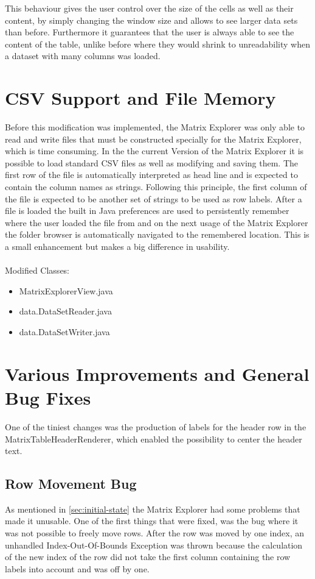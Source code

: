 This behaviour gives the user control over the size of the cells as well as their content, by simply changing the window size and allows to see larger data sets than before. Furthermore it guarantees that the user is always able to see the content of the table, unlike before where they would shrink to unreadability when a dataset with many columns was loaded.

\section{CSV Support and File Memory}

Before this modification was implemented, the Matrix Explorer was only able to read and write files that must be constructed specially for the Matrix Explorer, which is time consuming. In the the current Version of the Matrix Explorer it is possible to load standard CSV files as well as modifying and saving them. The first row of the file is automatically interpreted as head line and is expected to contain the column names as strings. Following this principle, the first column of the file is expected to be another set of strings to be used as row labels. After a file is loaded the built in Java preferences are used to persistently remember where the user loaded the file from and on the next usage  of the Matrix Explorer the folder browser is automatically navigated to the remembered location. This is a small enhancement but makes a big difference in usability.\\\\

Modified Classes:
\begin{itemize}
	\item MatrixExplorerView.java
	\item data.DataSetReader.java
	\item data.DataSetWriter.java
\end{itemize}


\section{Various Improvements and General Bug Fixes}

One of the tiniest changes was the production of labels for the header row in the MatrixTableHeaderRenderer, which enabled the possibility to center the header text.

\subsection{Row Movement Bug}
As mentioned in \ref{sec:initial-state} the Matrix Explorer had some problems that made it unusable. One of the first things that were fixed, was the bug where it was not possible to freely move rows. After the row was moved by one index, an unhandled Index-Out-Of-Bounds Exception was thrown because the calculation of the new index of the row did not take the first column containing the row labels into account and was off by one.

